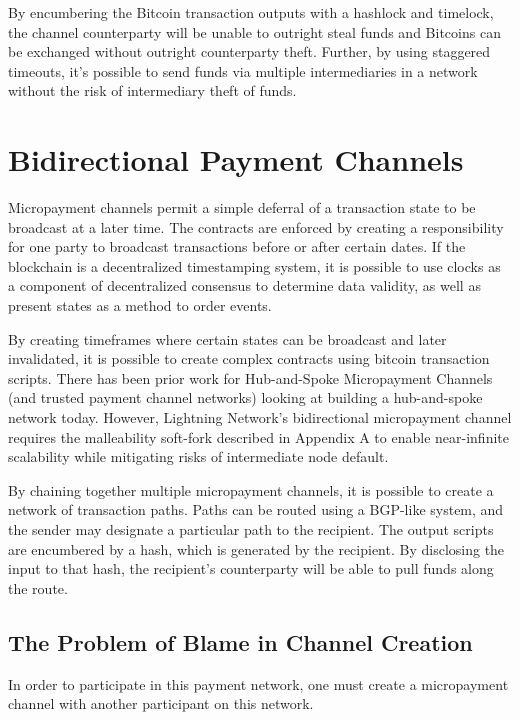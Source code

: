 \documentclass[letterpaper,11pt]{article}
\begin{document}
By encumbering the Bitcoin transaction outputs with a hashlock and timelock,
the channel counterparty will be unable to outright steal funds and Bitcoins
can be exchanged without outright counterparty theft. Further, by using
staggered timeouts, it's possible to send funds via multiple intermediaries in a
network without the risk of intermediary theft of funds.

\section{Bidirectional Payment Channels}

Micropayment channels permit a simple deferral of a transaction state to be
broadcast at a later time. The contracts are enforced by creating a
responsibility for one party to broadcast transactions before or after certain
dates. If the blockchain is a decentralized timestamping system, it is possible
to use clocks as a component of decentralized consensus\cite{lamportpaxos} to
determine data validity, as well as present states as a method to order
events\cite{lamportclocks}.

By creating timeframes where certain states can be broadcast and later
invalidated, it is possible to create complex contracts using bitcoin
transaction scripts. There has been prior work for Hub-and-Spoke Micropayment
Channels\cite{akselrod}\cite{akselrod2}\cite{todd} (and trusted payment channel
networks\cite{amikopay}\cite{impulse}) looking at building a hub-and-spoke
network today. However, Lightning Network's bidirectional micropayment channel
requires the malleability soft-fork described in Appendix A to enable
near-infinite scalability while mitigating risks of intermediate node default.

By chaining together multiple micropayment channels, it is possible to create a
network of transaction paths. Paths can be routed using a BGP-like system, and
the sender may designate a particular path to the recipient. The output scripts
are encumbered by a hash, which is generated by the recipient. By disclosing
the input to that hash, the recipient's counterparty will be able to pull funds
along the route.

\subsection{The Problem of Blame in Channel Creation}

In order to participate in this payment network, one must create a micropayment
channel with another participant on this network. 
\end{document}
